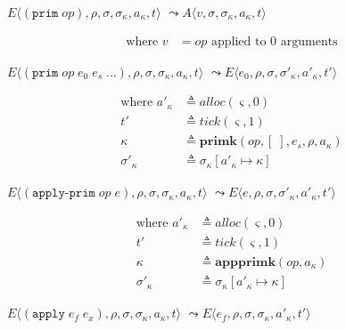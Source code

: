 \documentclass[12pt,draft]{article}
\newcommand{\primsyn}[2]{(\texttt{prim}\;#1\;#2\;...)}
\newcommand{\singleprimsyn}[1]{(\texttt{prim}\;#1)}
\newcommand{\applyprimsyn}[2]{(\texttt{apply-prim}\;#1\;#2)}
\newcommand{\applysyn}[2]{(\texttt{apply}\;#1\;#2)}
\begin{document}
{\begin{multicols*}{2}
\begin{center}
  $E\langle \singleprimsyn{op} , \rho , \sigma , \sigma_\kappa , a_\kappa , t \rangle$
  $\leadsto A\langle v , \sigma , \sigma_\kappa , a_\kappa , t \rangle$
\end{center}
\vspace{-7mm}
\begin{align*}
\text{where } v &= op \text{ applied to } 0 \text{ arguments}
\end{align*}
\begin{center}
  $E\langle \primsyn{op}{e_0\;e_s} , \rho , \sigma , \sigma_\kappa , a_\kappa , t \rangle$
  $\leadsto E\langle e_0 , \rho , \sigma , \sigma'_\kappa , a'_\kappa , t' \rangle$
\end{center}
\vspace{-7mm}
\begin{align*}
  \text{where }
  a'_\kappa &\triangleq alloc(\varsigma, 0) \\
  t' &\triangleq tick(\varsigma, 1) \\
  \kappa &\triangleq \textbf{primk}(op, [\;], e_s, \rho, a_\kappa) \\
  \sigma'_\kappa &\triangleq \sigma_\kappa[a'_\kappa \mapsto \kappa]
\end{align*}
\begin{center}
  $E\langle \applyprimsyn{op}{e} , \rho , \sigma , \sigma_\kappa , a_\kappa , t \rangle$
  $\leadsto E\langle e , \rho , \sigma , \sigma'_\kappa , a'_\kappa , t' \rangle$
\end{center}
\vspace{-7mm}
\begin{align*}
  \text{where }
  a'_\kappa &\triangleq alloc(\varsigma, 0) \\
  t' &\triangleq tick(\varsigma, 1) \\
  \kappa &\triangleq \textbf{appprimk}(op, a_\kappa) \\
  \sigma'_\kappa &\triangleq \sigma_\kappa[a'_\kappa \mapsto \kappa]
\end{align*}
\begin{center}
  $E\langle \applysyn{e_f}{e_x} , \rho , \sigma , \sigma_\kappa , a_\kappa , t \rangle$
  $\leadsto E\langle e_f , \rho , \sigma , \sigma_\kappa , a'_\kappa , t' \rangle$
\end{center}

\end{multicols*}}
\end{document}
